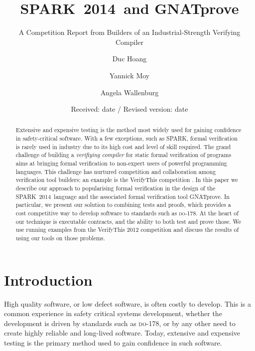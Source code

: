 \documentclass[sttt,final]{svjour}
\newcommand{\DO}{\textsc{do-178}}
\newcommand{\gnatprove}{GNATprove\xspace}
\newcommand{\newspark}{SPARK~2014\xspace}
\begin{document}
%
\title{\newspark\ and \gnatprove}
\subtitle{A Competition Report from Builders of an Industrial-Strength Verifying Compiler}
\author{Duc Hoang \and Yannick Moy \and Angela Wallenburg
}                     %

\date{Received: date / Revised version: date}
%
\maketitle
%
\begin{abstract}
  Extensive and expensive testing is the method most widely used for
  gaining confidence in safety-critical software. With a few
  exceptions, such as SPARK, formal verification is rarely used in
  industry due to its high cost and level of skill required. The grand
  challenge of building a \emph{verifiying compiler} for static formal
  verification of programs aims at bringing formal verification to
  non-expert users of powerful programming languages. This challenge
  has nurtured competition and collaboration among verification tool
  builders; an example is the VerifyThis competition
  \cite{VerifyThis2012}. In this paper we describe our approach to
  popularising formal verification in the design of the
  \newspark\ language and the associated formal verification tool
  \gnatprove. In particular, we present our solution to combining
  tests and proofs, which provides a cost competitive way to develop
  software to standards such as \DO.  At the heart of our technique is
  executable contracts, and the ability to both test and prove
  those. We use running examples from the VerifyThis 2012 competition
  and discuss the results of using our tools on those problems.
\end{abstract}
%
\section{Introduction}
\label{intro}
High quality software, or low defect software, is often costly to
develop. This is a common experience in safety critical systems
development, whether the development is driven by standards such as
\DO, or by any other need to create highly reliable and long-lived
software. Today, extensive and expensive testing is the primary method
used to gain confidence in such software.
\end{document}
